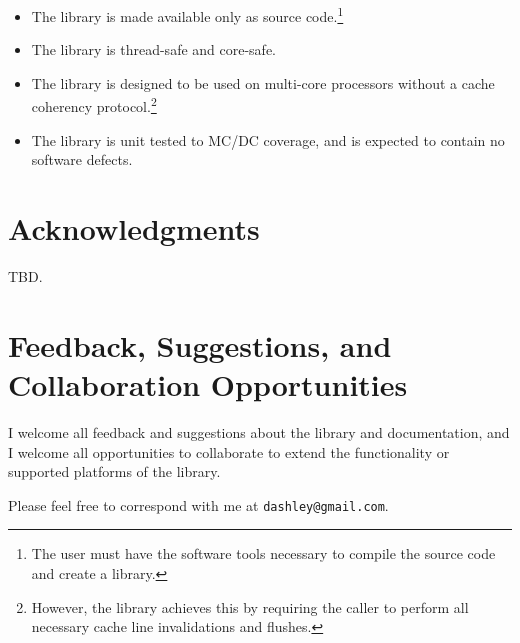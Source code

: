 \begin{itemize}
{      eliminate unused functions and data structures from these files so that the FLASH footprint
      is the same as if a library is used.}
\item The library is made available only as source code.\footnote{The user must
      have the software tools necessary to compile the source code and create a
      library.}
\item The library is thread-safe and core-safe.
\item The library is designed to be used on multi-core processors without
      a cache coherency protocol.\footnote{However, the library achieves this by
      requiring the caller to perform all necessary cache line invalidations
      and flushes.}
\item The library is unit tested to MC/DC coverage, and is 
      expected to contain no software defects.  
\end{itemize}


\section{Acknowledgments}
\label{ciov0:sack0}
 
TBD. 


\section{Feedback, Suggestions, and Collaboration Opportunities}
\label{ciov0:sfbk0}

I welcome all feedback and suggestions about the library and 
documentation, and I welcome all opportunities to collaborate to extend 
the functionality or supported platforms of the library.  

Please feel free to correspond with me at \texttt{dashley@\-gmail.com}.


